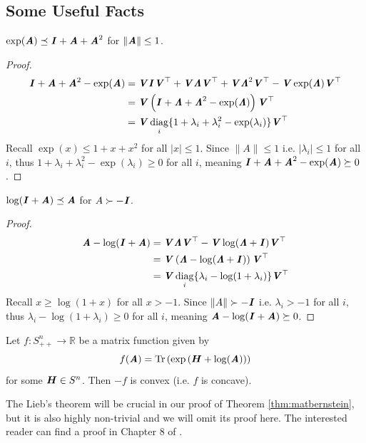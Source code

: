 \subsection{Some Useful Facts}
\begin{lemma}\label{lem:ineq_exp}
  $\exp(\AA) \preceq \II + \AA + \AA^2$ for $\|\AA\|\leq1$.
\end{lemma}
\begin{proof}
  \begin{align*}
    \II+\AA+\AA^2-\exp(\AA)
    &= \VV\II\VV^\trp + \VV\LLambda\VV^\trp + \VV\LLambda^2\VV^\trp - \VV\exp(\LLambda)\VV^\trp \\
    &= \VV\left(\II+\LLambda+\LLambda^2-\exp(\LLambda)\right)\VV^\trp \\
    &= \VV \diag_i\{1+\lambda_i+\lambda_i^2-\exp(\lambda_i)\} \VV^\trp
  \end{align*}
  Recall $\exp(x)\leq1+x+x^2$ for all $|x|\leq1$.
  Since $\|A\|\leq1$ i.e. $|\lambda_i|\leq1$ for all $i$, thus $1+\lambda_i+\lambda_i^2-\exp(\lambda_i)\geq0$ for all $i$,
  meaning $\II+\AA+\AA^2-\exp(\AA) \succeq 0$.
\end{proof}

\begin{lemma}\label{lem:ineq_log}
  $\log(\II+\AA) \preceq \AA$ for $A\succ-\II$.
\end{lemma}
\begin{proof}
  \begin{align*}
    \AA-\log(\II+\AA)
    &= \VV\LLambda\VV^\trp - \VV\log(\LLambda+\II)\VV^\trp \\
    &= \VV\left(\LLambda-\log(\LLambda+\II)\right)\VV^\trp \\
    &= \VV \diag_i\{\lambda_i-\log(1+\lambda_i)\} \VV^\trp
  \end{align*}
  Recall $x\geq\log(1+x)$ for all $x>-1$.
  Since $\|A\|\succ-\II$ i.e. $\lambda_i>-1$ for all $i$, thus $\lambda_i-\log(1+\lambda_i)\geq0$ for all $i$,
  meaning $\AA-\log(\II+\AA) \succeq 0$.
\end{proof}

\begin{theorem}[Lieb]
  \label{thm:Lieb}
  Let $f:S^n_{++}\to\mathbb{R}$ be a matrix function given by
  \[ f(\AA) = \trace{\exp\left(\HH+\log(\AA)\right)} \]
  for some $\HH\in S^n$. Then $-f$ is convex (i.e. $f$ is concave).
\end{theorem}
The Lieb's theorem will be crucial in our proof of Theorem \ref{thm:matbernstein},
but it is also highly non-trivial and we will omit its proof here.
The interested reader can find a proof in Chapter 8 of \cite{tropp15}.

